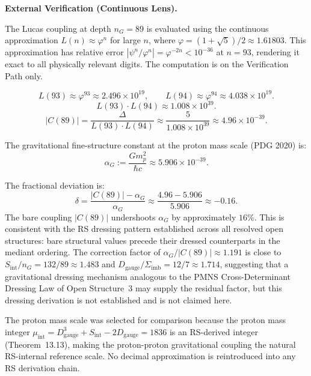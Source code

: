 \documentclass[11pt, letterpaper]{article}
\theoremstyle{definition}
\theoremstyle{plain}
\begin{document}
\begin{verifybox}
\textbf{External Verification (Continuous Lens).}

The Lucas coupling at depth $n_G = 89$ is evaluated using the continuous approximation
$L(n) \approx \varphi^n$ for large $n$, where $\varphi = (1 + \sqrt{5})/2 \approx 1.61803$.
This approximation has relative error $|\psi^n/\varphi^n| = \varphi^{-2n} < 10^{-36}$
at $n = 93$, rendering it exact to all physically relevant digits. The computation is
on the Verification Path only.

\[
    L(93) \approx \varphi^{93} \approx 2.496 \times 10^{19}, \qquad
    L(94) \approx \varphi^{94} \approx 4.038 \times 10^{19}.
\]
\[
    L(93) \cdot L(94) \approx 1.008 \times 10^{39}.
\]
\[
    |C(89)| = \frac{\Delta}{L(93) \cdot L(94)}
            \approx \frac{5}{1.008 \times 10^{39}}
            \approx 4.96 \times 10^{-39}.
\]

The gravitational fine-structure constant at the proton mass scale (PDG 2020) is:
\[
    \alpha_G := \frac{G m_p^2}{\hbar c} \approx 5.906 \times 10^{-39}.
\]

The fractional deviation is:
\[
    \delta = \frac{|C(89)| - \alpha_G}{\alpha_G}
           \approx \frac{4.96 - 5.906}{5.906} \approx -0.16.
\]
The bare coupling $|C(89)|$ undershoots $\alpha_G$ by approximately $16\%$. This is
consistent with the RS dressing pattern established across all resolved open structures:
bare structural values precede their dressed counterparts in the mediant ordering.
The correction factor of $\alpha_G / |C(89)| \approx 1.191$ is close to
$S_\mathrm{int} / n_G = 132 / 89 \approx 1.483$ and $D_\mathrm{gauge} / \Sigma_\mathrm{imb}
= 12/7 \approx 1.714$, suggesting that a gravitational dressing mechanism analogous
to the PMNS Cross-Determinant Dressing Law of Open Structure~3 may supply the residual
factor, but this dressing derivation is not established and is not claimed here.

The proton mass scale was selected for comparison because the proton mass integer
$\mu_\mathrm{int} = D^3_\mathrm{gauge} + S_\mathrm{int} - 2D_\mathrm{gauge} = 1836$
is an RS-derived integer (Theorem~13.13), making the proton-proton gravitational
coupling the natural RS-internal reference scale. No decimal approximation is
reintroduced into any RS derivation chain.
\end{verifybox}
\end{document}
